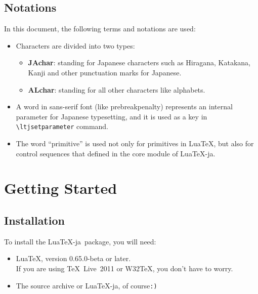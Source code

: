 \documentclass[a4paper,titlepage]{article}
\begin{document}
\subsection{Notations}
In this document, the following terms and notations are used:
\begin{itemize}
\item Characters are divided into two types: 
\begin{itemize}
\item \textbf{JAchar}: standing for Japanese characters such as Hiragana, Katakana, Kanji and other punctuation marks for Japanese.
\item \textbf{ALchar}: standing for all other characters like alphabets. 
\end{itemize}
\item A word in sans-serif font (like \textsf{prebreakpenalty}) represents an internal parameter for Japanese typesetting, and
it is used as a key in \verb+\ltjsetparameter+ command.
\item The word ``primitive'' is used not only for primitives in Lua\TeX, but also for control sequences that defined 
in the core module of Lua\TeX-ja.
\end{itemize}

\newpage
\section{Getting Started}
\subsection{Installation}
To install the Lua\TeX-ja\ package, you will need:
\begin{itemize}
\item Lua\TeX, version 0.65.0-beta or later.\\
If you are using \TeX~Live\ 2011 or W32\TeX, you don't have to worry.
\item The source archive or Lua\TeX-ja, of course{\tt:)}
\end{itemize}
\end{document}

